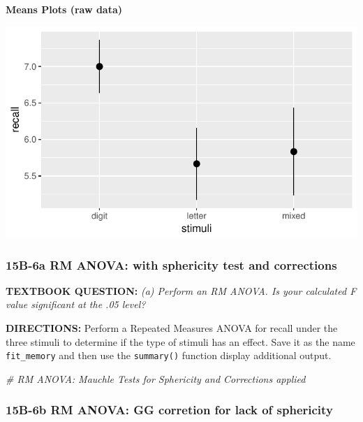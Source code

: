 \documentclass[]{article}
\newenvironment{Shaded}{\begin{snugshade}}{\end{snugshade}}
\newcommand{\CommentTok}[1]{\textcolor[rgb]{0.56,0.35,0.01}{\textit{#1}}}
\begin{document}
\textbf{Means Plots (raw data)}

\begin{center}\includegraphics{Unit_5_assignment_SKELETON_R__spr18__files/figure-latex/unnamed-chunk-24-1} \end{center}

\clearpage

\subsubsection{15B-6a RM ANOVA: with sphericity test and
corrections}\label{b-6a-rm-anova-with-sphericity-test-and-corrections}

\textbf{TEXTBOOK QUESTION:} \emph{(a) Perform an RM ANOVA. Is your
calculated F value significant at the .05 level?}

\textbf{DIRECTIONS:} Perform a Repeated Measures ANOVA for recall under
the three stimuli to determine if the type of stimuli has an effect.
Save it as the name \texttt{fit\_memory} and then use the
\texttt{summary()} function display additional output.

\begin{Shaded}
\begin{Highlighting}[]
\CommentTok{# RM ANOVA: Mauchle Tests for Sphericity and Corrections applied}
\end{Highlighting}
\end{Shaded}

\clearpage

\subsubsection{15B-6b RM ANOVA: GG corretion for lack of
sphericity}\label{b-6b-rm-anova-gg-corretion-for-lack-of-sphericity}
\end{document}
